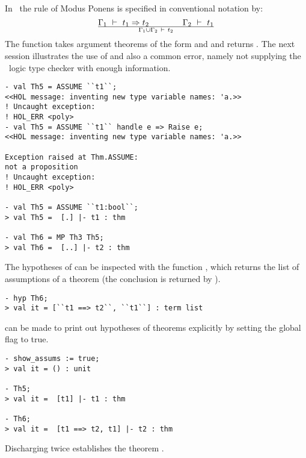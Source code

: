     In \HOL\, the rule  of Modus Ponens is specified in
    conventional notation by:
\[
\Gamma_1 \ \vdash\  t_1 \Rightarrow t_2 \qquad\qquad \Gamma_2\ \vdash\  t_1\over
\Gamma_1 \cup \Gamma_2 \ \vdash\  t_2
\]
The \ML{} function  takes argument theorems of the form
 and  and
returns . The next session illustrates the use
of  and also a common error, namely not supplying the \HOL\
logic type checker with enough information.

\begin{session}\begin{verbatim}
- val Th5 = ASSUME ``t1``;
<<HOL message: inventing new type variable names: 'a.>>
! Uncaught exception:
! HOL_ERR <poly>
- val Th5 = ASSUME ``t1`` handle e => Raise e;
<<HOL message: inventing new type variable names: 'a.>>

Exception raised at Thm.ASSUME:
not a proposition
! Uncaught exception:
! HOL_ERR <poly>

- val Th5 = ASSUME ``t1:bool``;
> val Th5 =  [.] |- t1 : thm

- val Th6 = MP Th3 Th5;
> val Th6 =  [..] |- t2 : thm
\end{verbatim}\end{session}

    The hypotheses of  can be inspected with the \ML{} function
    \ml{hyp}, which returns the list of assumptions of a theorem (the
    conclusion is returned by \ml{concl}).

\begin{session}\begin{verbatim}
- hyp Th6;
> val it = [``t1 ==> t2``, ``t1``] : term list
\end{verbatim}\end{session}

    \HOL{} can be made to print out hypotheses of theorems explicitly
    by setting the global flag \ml{show\_assums} to true.

\begin{session}\begin{verbatim}
- show_assums := true;
> val it = () : unit

- Th5;
> val it =  [t1] |- t1 : thm

- Th6;
> val it =  [t1 ==> t2, t1] |- t2 : thm
\end{verbatim}\end{session}


\noindent Discharging  twice establishes the theorem
.

